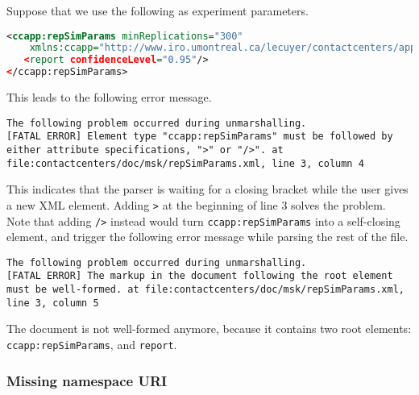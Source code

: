 Suppose that we use the following as experiment parameters.
\begin{lstlisting}[language=XML]
<ccapp:repSimParams minReplications="300"
    xmlns:ccapp="http://www.iro.umontreal.ca/lecuyer/contactcenters/app"
   <report confidenceLevel="0.95"/>
</ccapp:repSimParams>
\end{lstlisting}
This leads to the following error message.
\begin{lstlisting}[language={},breaklines,prebreak={\char92}]
The following problem occurred during unmarshalling.
[FATAL ERROR] Element type "ccapp:repSimParams" must be followed by either attribute specifications, ">" or "/>". at file:contactcenters/doc/msk/repSimParams.xml, line 3, column 4
\end{lstlisting}
This indicates that the parser is waiting for a closing bracket while
the user gives a new XML element.
Adding \texttt{>} at the beginning of line 3 solves the problem.
Note that adding \texttt{/>} instead would turn
\texttt{ccapp:repSimParams} into a self-closing element, and trigger
the following error message while parsing the rest of the file.
\begin{lstlisting}[language={},breaklines,prebreak={\char92}]
The following problem occurred during unmarshalling.
[FATAL ERROR] The markup in the document following the root element must be well-formed. at file:contactcenters/doc/msk/repSimParams.xml, line 3, column 5
\end{lstlisting}
The document is not well-formed anymore, because it contains two root
elements: \texttt{ccapp:rep\-Sim\-Params}, and \texttt{report}.

\subsubsection{Missing namespace URI}

